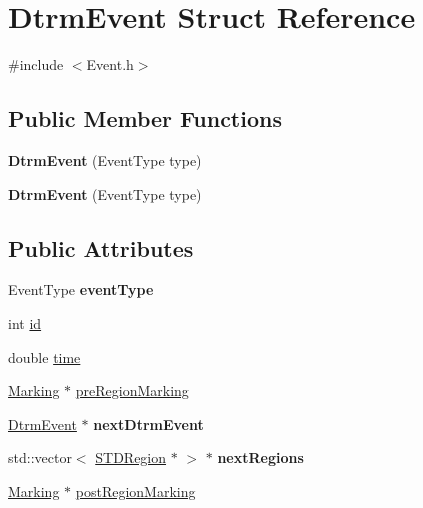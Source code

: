 \hypertarget{structDtrmEvent}{\section{Dtrm\-Event Struct Reference}
\label{structDtrmEvent}
}


{\ttfamily \#include $<$Event.\-h$>$}

\subsection*{Public Member Functions}
\begin{DoxyCompactItemize}
\item 
\hypertarget{structDtrmEvent_a9ff83f26140ece31d58b6f9ea33fc0ec}{{\bfseries Dtrm\-Event} (Event\-Type type)}\label{structDtrmEvent_a9ff83f26140ece31d58b6f9ea33fc0ec}

\item 
\hypertarget{structDtrmEvent_a9ff83f26140ece31d58b6f9ea33fc0ec}{{\bfseries Dtrm\-Event} (Event\-Type type)}\label{structDtrmEvent_a9ff83f26140ece31d58b6f9ea33fc0ec}

\end{DoxyCompactItemize}
\subsection*{Public Attributes}
\begin{DoxyCompactItemize}
\item 
\hypertarget{structDtrmEvent_a15d88c4e3e37f6e2f81ea826e4bce5dd}{Event\-Type {\bfseries event\-Type}}\label{structDtrmEvent_a15d88c4e3e37f6e2f81ea826e4bce5dd}

\item 
int \hyperlink{structDtrmEvent_ab5e19522a82d496b8a66791bce168d81}{id}
\item 
double \hyperlink{structDtrmEvent_a23d94e3ab2a80c673f5e42aac1b6ecb0}{time}
\item 
\hyperlink{structMarking}{Marking} $\ast$ \hyperlink{structDtrmEvent_acaa9ee345f104aee09a01fe0594eab70}{pre\-Region\-Marking}
\item 
\hypertarget{structDtrmEvent_a2fd402a2460e7cc074a3351e82eb40dd}{\hyperlink{structDtrmEvent}{Dtrm\-Event} $\ast$ {\bfseries next\-Dtrm\-Event}}\label{structDtrmEvent_a2fd402a2460e7cc074a3351e82eb40dd}

\item 
\hypertarget{structDtrmEvent_a5f3587028a3fb59d48df3a343a4b2b45}{std\-::vector$<$ \hyperlink{classSTDRegion}{S\-T\-D\-Region} $\ast$ $>$ $\ast$ {\bfseries next\-Regions}}\label{structDtrmEvent_a5f3587028a3fb59d48df3a343a4b2b45}

\item 
\hyperlink{structMarking}{Marking} $\ast$ \hyperlink{structDtrmEvent_adb35b6b002efbadbb2c01c36ff9bffb0}{post\-Region\-Marking}
\end{DoxyCompactItemize}


